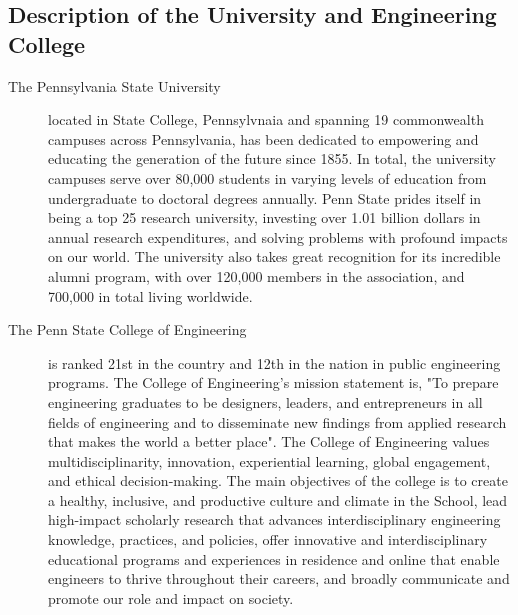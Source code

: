 \documentclass[../main.tex]{subfiles}
\begin{document}
\begin{appendices}
\begin{singlespace}
\section{Description of the University and Engineering College}\label{apxB}
\begin{description}
\item[The Pennsylvania State University]located in State College, Pennsylvnaia and spanning 19 commonwealth campuses across Pennsylvania, has been dedicated to empowering and educating the generation of the future since 1855. In total, the university campuses serve over 80,000 students in varying levels of education from undergraduate to doctoral degrees annually. Penn State prides itself in being a top 25 research university, investing over 1.01 billion dollars in annual research expenditures, and solving problems with profound impacts on our world. The university also takes great recognition for its incredible alumni program, with over 120,000 members in the association, and 700,000 in total living worldwide. \par
\item[The Penn State College of Engineering]is ranked 21st in the country and 12th in the nation in public engineering programs. The College of Engineering's mission statement is, "To prepare engineering graduates to be designers, leaders, and entrepreneurs in all fields of engineering and to disseminate new findings from applied research that makes the world a better place". The College of Engineering values multidisciplinarity, innovation, experiential learning, global engagement, and ethical decision-making. The main objectives of the college is to create a healthy, inclusive, and productive culture and climate in the School, lead high-impact scholarly research that advances interdisciplinary engineering knowledge, practices, and policies, offer innovative and interdisciplinary educational programs and experiences in residence and online that enable engineers to thrive throughout their careers, and broadly communicate and promote our role and impact on society. \par
\end{description}
    
\newpage

\end{singlespace}
\end{appendices}
\end{document}
